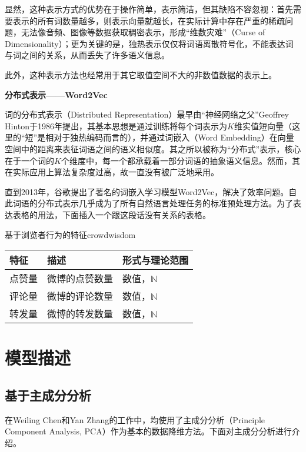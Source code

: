 \documentclass[a4paper,oneside,12pt]{book}
\begin{document}
显然，这种表示方式的优势在于操作简单，表示简洁，但其缺陷不容忽视：首先需要表示的所有词数量越多，则表示向量就越长，在实际计算中存在严重的稀疏问题，无法像音频、图像等数据获取稠密表示，形成“维数灾难”（Curse of Dimensionality）\cite{Bengio2006A}；更为关键的是，独热表示仅仅将词语离散符号化，不能表达词与词之间的关系，从而丢失了许多语义信息。

此外，这种表示方法也经常用于其它取值空间不大的非数值数据的表示上。

\textbf{分布式表示——Word2Vec}

词的分布式表示（Distributed Representation）最早由“神经网络之父”Geoffrey Hinton于1986年提出\cite{Hinton1986Learning}，其基本思想是通过训练将每个词表示为$K$维实值短向量（这里的“短”是相对于独热编码而言的），并通过词嵌入（Word Embedding）在向量空间中的距离来表征词语之间的语义相似度。其之所以被称为“分布式”表示，核心在于一个词的$K$个维度中，每一个都承载着一部分词语的抽象语义信息。然而，其在实际应用上算法复杂度过高，故一直没有被广泛地采用。

直到2013年，谷歌提出了著名的词嵌入学习模型Word2Vec\cite{mikolov2013distributed}，解决了效率问题。自此词语的分布式表示几乎成为了所有自然语言处理任务的标准预处理方法。为了表达表格的用法，下面插入一个跟这段话没有关系的表格。

\begin{bupttable}{基于浏览者行为的特征}{crowdwisdom}
    \begin{tabular}{l|l|l}
		\hline \textbf{特征} & \textbf{描述} & \textbf{形式与理论范围}\\
		\hline 点赞量 & 微博的点赞数量 & 数值，$\mathbb{N}$ \\
		\hline 评论量 & 微博的评论数量 & 数值，$\mathbb{N}$ \\
		\hline 转发量 & 微博的转发数量 & 数值，$\mathbb{N}$ \\
		\hline
    \end{tabular}
\end{bupttable}

\section{模型描述}

\subsection{基于主成分分析}
在Weiling Chen\cite{Chen2016Behavior}和Yan Zhang\cite{Yan2017OneHot}的工作中，均使用了主成分分析（Principle Component Analysis,  PCA）作为基本的数据降维方法。下面对主成分分析进行介绍。
\end{document}
